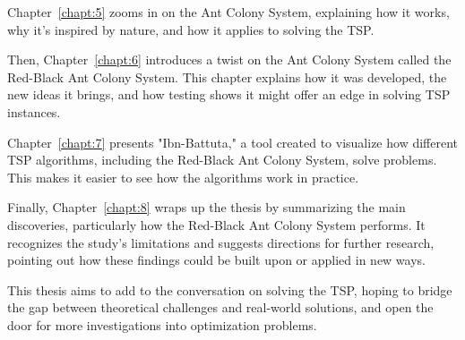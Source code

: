 Chapter~\ref{chapt:5} zooms in on the Ant Colony System, explaining how it works, why it's inspired by nature, and how it applies to solving the TSP.

Then, Chapter~\ref{chapt:6} introduces a twist on the Ant Colony System called the Red-Black Ant Colony System. This chapter explains how it was developed, the new ideas it brings, and how testing shows it might offer an edge in solving TSP instances.

Chapter~\ref{chapt:7} presents "Ibn-Battuta," a tool created to visualize how different TSP algorithms, including the Red-Black Ant Colony System, solve problems. This makes it easier to see how the algorithms work in practice.

Finally, Chapter~\ref{chapt:8} wraps up the thesis by summarizing the main discoveries, particularly how the Red-Black Ant Colony System performs. It recognizes the study's limitations and suggests directions for further research, pointing out how these findings could be built upon or applied in new ways.

This thesis aims to add to the conversation on solving the TSP, hoping to bridge the gap between theoretical challenges and real-world solutions, and open the door for more investigations into optimization problems.
